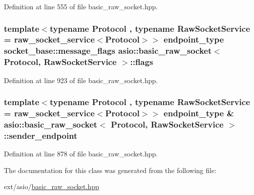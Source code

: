 Definition at line 555 of file basic\+\_\+raw\+\_\+socket.\+hpp.

\hypertarget{classasio_1_1basic__raw__socket_a66abaa42609bd5723f723050d869ea8c}{}
\subsubsection[{flags}]{\setlength{\rightskip}{0pt plus 5cm}template$<$typename Protocol , typename Raw\+Socket\+Service  = raw\+\_\+socket\+\_\+service$<$\+Protocol$>$$>$ {\bf endpoint\+\_\+type} {\bf socket\+\_\+base\+::message\+\_\+flags} {\bf asio\+::basic\+\_\+raw\+\_\+socket}$<$ Protocol, Raw\+Socket\+Service $>$\+::flags}\label{classasio_1_1basic__raw__socket_a66abaa42609bd5723f723050d869ea8c}


Definition at line 923 of file basic\+\_\+raw\+\_\+socket.\+hpp.

\hypertarget{classasio_1_1basic__raw__socket_aa2e1f2e9f86892704225b64abe99c528}{}
\subsubsection[{sender\+\_\+endpoint}]{\setlength{\rightskip}{0pt plus 5cm}template$<$typename Protocol , typename Raw\+Socket\+Service  = raw\+\_\+socket\+\_\+service$<$\+Protocol$>$$>$ {\bf endpoint\+\_\+type} \& {\bf asio\+::basic\+\_\+raw\+\_\+socket}$<$ Protocol, Raw\+Socket\+Service $>$\+::sender\+\_\+endpoint}\label{classasio_1_1basic__raw__socket_aa2e1f2e9f86892704225b64abe99c528}


Definition at line 878 of file basic\+\_\+raw\+\_\+socket.\+hpp.



The documentation for this class was generated from the following file\+:\begin{DoxyCompactItemize}
\item 
ext/asio/\hyperlink{basic__raw__socket_8hpp}{basic\+\_\+raw\+\_\+socket.\+hpp}\end{DoxyCompactItemize}
